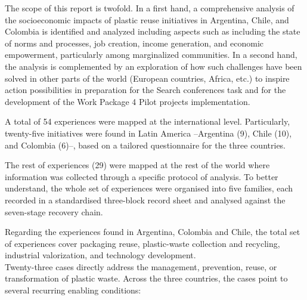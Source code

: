 \documentclass[
  12pt,
  oneside]{book}
\begin{document}
The scope of this report is twofold. In a first hand, a comprehensive
analysis of the socioeconomic impacts of plastic reuse initiatives in
Argentina, Chile, and Colombia is identified and analyzed including
aspects such as including the state of norms and processes, job
creation, income generation, and economic empowerment, particularly
among marginalized communities. In a second hand, the analysis is
complemented by an exploration of how such challenges have been solved
in other parts of the world (European countries, Africa, etc.) to
inspire action possibilities in preparation for the Search conferences
task and for the development of the Work Package 4 Pilot projects
implementation.

A total of 54 experiences were mapped at the international level.
Particularly, twenty-five initiatives were found in Latin America
--Argentina (9), Chile (10), and Colombia (6)--, based on a tailored
questionnaire for the three countries.

The rest of experiences (29) were mapped at the rest of the world where
information was collected through a specific protocol of analysis. To
better understand, the whole set of experiences were organised into five
families, each recorded in a standardised three-block record sheet and
analysed against the seven-stage recovery chain.

Regarding the experiences found in Argentina, Colombia and Chile, the
total set of experiences cover packaging reuse, plastic-waste collection
and recycling, industrial valorization, and technology development.\\
Twenty-three cases directly address the management, prevention, reuse,
or transformation of plastic waste. Across the three countries, the
cases point to several recurring enabling conditions:
\end{document}
